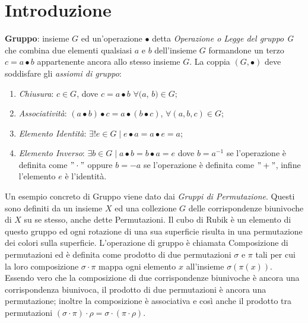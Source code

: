 \documentclass[a4paper,12pt]{tesiinfo}
\begin{document}
\maketitle
\contentspage
\chapter{Introduzione}


%
%
%
\textbf{Gruppo}: insieme $G$ ed un'operazione $\bullet$ detta \textit{Operazione o Legge del gruppo G} che combina due elementi qualsiasi $a$ e $b$ dell'insieme $G$ formandone un terzo $c = a\bullet b$ appartenente ancora allo stesso insieme $G$. 
La coppia $(G, \bullet)$ deve soddisfare gli \textit{assiomi di gruppo}:
\begin{enumerate}
    \item \textit{Chiusura}: $ c \in G$, dove $c = a\bullet b$ $ \forall (a$, $b) \in G$;
    \item \textit{Associativit\`a}: $\left ( a\bullet b \right ) \bullet c = a \bullet \left ( b \bullet c \right ) $, $ \forall (a, b, c) \in G$;
    \item \textit{Elemento Identit\`a}: $ \exists ! e \in G \mid e \bullet a = a \bullet e = a$;
    \item \textit{Elemento Inverso}: $\exists b \in G \mid a \bullet b = b \bullet a = e$ dove $b = a^{-1} $ se l'operazione \`e definita come $"\cdot"$ oppure $b = -a $ se l'operazione \`e definita come $"+"$, infine l'elemento $e$ \`e l'identit\`a.
\end{enumerate} 
Un esempio concreto di Gruppo viene dato dai \textit{Gruppi di Permutazione}. Questi sono definiti da un insieme $X$ ed una collezione $G$ delle corrispondenze biunivoche di $X$ su se stesso, anche dette Permutazioni. Il cubo di Rubik \`e un elemento di questo gruppo ed ogni rotazione di una sua superficie risulta in una permutazione dei colori sulla superficie. 
\newline
L'operazione di gruppo \`e chiamata Composizione di permutazioni ed \`e definita come prodotto di due permutazioni $\sigma$ e $\pi$ tali per cui la loro composizione $\sigma \cdot \pi$ mappa ogni elemento $x$ all'insieme $\sigma ( \pi ( x ) )$. Essendo vero che la composizione di due corrispondenze biunivoche \`e ancora una corrispondenza biunivoca, il prodotto di due permutazioni \`e ancora una permutazione; inoltre la composizione \`e associativa e cos\`i anche il prodotto tra permutazioni $ (\sigma \cdot \pi) \cdot \rho = \sigma \cdot ( \pi \cdot \rho )$.
\end{document}

